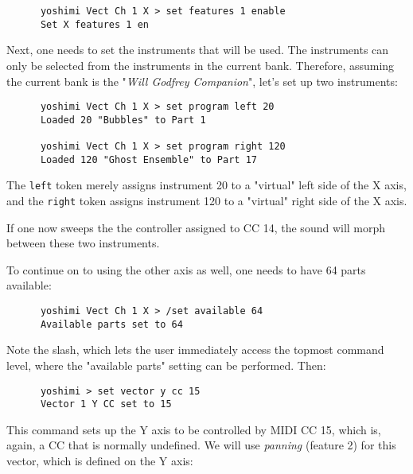    \begin{verbatim}
      yoshimi Vect Ch 1 X > set features 1 enable
      Set X features 1 en
   \end{verbatim}

   Next, one needs to set the instruments that will be used.
   The instruments can only be selected from the instruments
   in the current bank. Therefore, assuming the current bank is
   the "\textsl{Will Godfrey Companion}", let's set up two instruments:

   \begin{verbatim}
      yoshimi Vect Ch 1 X > set program left 20
      Loaded 20 "Bubbles" to Part 1

      yoshimi Vect Ch 1 X > set program right 120
      Loaded 120 "Ghost Ensemble" to Part 17
   \end{verbatim}

   The \texttt{left} token merely assigns instrument 20 to a "virtual"
   left side of the X axis,
   and the \texttt{right} token assigns instrument 120 to a "virtual"
   right side of the X axis.

\iffalse  The wrong channel was identifed in the text :(
   \textsl{(Chris asks:  How did the part numbers 1 and 16 come about? What
   are the rules?  Why are 32 parts needed, if only 1 to 16 are involved?  Why
   do we need to have 64 parts when we add the Y axis below?  Can we set
   intermediate values between "left" and "right" and "up" and "down" to
   get some really weird morphs?)}
\fi

   If one now sweeps the the controller assigned to CC 14,
   the sound will morph between these two instruments.

   To continue on to using the other axis as well, one needs to have 64 parts
   available:

   \begin{verbatim}
      yoshimi Vect Ch 1 X > /set available 64
      Available parts set to 64
   \end{verbatim}

   Note the slash, which lets the user immediately access the topmost command
   level, where the "available parts" setting can be performed.
   Then:

   \begin{verbatim}
      yoshimi > set vector y cc 15
      Vector 1 Y CC set to 15
   \end{verbatim}

   This command sets up the Y axis to be controlled by MIDI CC 15, which is,
   again, a CC that is normally undefined.
   We will use \textsl{panning} (feature 2) for this vector, which is defined
   on the Y axis:

